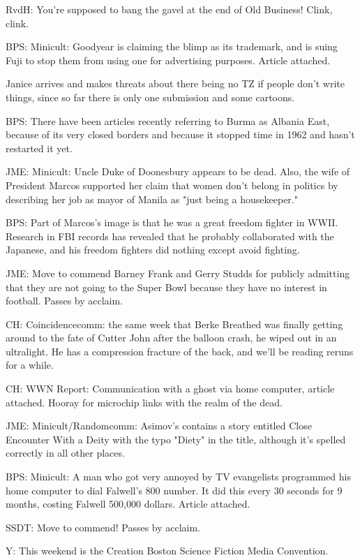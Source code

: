 \documentclass[12pt]{article}
\begin{document}
RvdH: You're supposed to bang the gavel at the end of Old Business! Clink, clink.

BPS: Minicult: Goodyear is claiming the blimp as its trademark, and is suing Fuji to stop them from using one for advertising purposes. Article attached.

Janice arrives and makes threats about there being no TZ if people don't write things, since so far there is only one submission and some cartoons.

BPS: There have been articles recently referring to Burma as Albania East, because of its very closed borders and because it stopped time in 1962 and hasn't restarted it yet.

JME: Minicult: Uncle Duke of Doonesbury appears to be dead. Also, the wife of President Marcos supported her claim that women don't belong in politics by describing her job as mayor of Manila as "just being a housekeeper."

BPS: Part of Marcos's image is that he was a great freedom fighter in WWII. Research in FBI records has revealed that he probably collaborated with the Japanese, and his freedom fighters did nothing except avoid fighting.

JME: Move to commend Barney Frank and Gerry Studds for publicly admitting that they are not going to the Super Bowl because they have no interest in football. Passes by acclaim.

CH: Coincidencecomm: the same week that Berke Breathed was finally getting around to the fate of Cutter John after the balloon crash, he wiped out in an ultralight. He has a compression fracture of the back, and we'll be reading reruns for a while.

CH: WWN Report: Communication with a ghost via home computer, article attached. Hooray for microchip links with the realm of the dead.

JME: Minicult/Randomcomm: Asimov's contains a story entitled Close Encounter With a Deity with the typo "Diety" in the title, although it's spelled correctly in all other places.

BPS: Minicult: A man who got very annoyed by TV evangelists programmed his home computer to dial Falwell's 800 number. It did this every 30 seconds for 9 months, costing Falwell 500,000 dollars. Article attached.

SSDT: Move to commend! Passes by acclaim.

Y: This weekend is the Creation Boston Science Fiction Media Convention.
\end{document}
